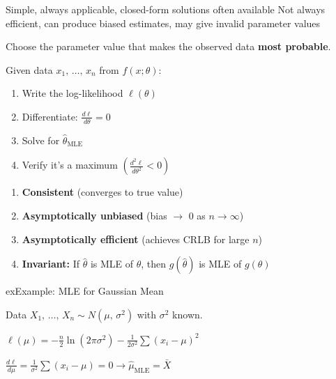 
\PSyes{} Simple, always applicable, closed-form solutions often available\PSbr{}\PSno{} Not always efficient, can produce biased estimates, may give invalid parameter values



Choose the parameter value that makes the observed data \textbf{most probable}.


Given data $x_{1},\, \ldots,\, x_{n}$ from $f(x; \theta)$:





\begin{enumerate}
\def\labelenumi{\arabic{enumi}.}
\tightlist
\item
  Write the log-likelihood $\ell (\theta)$
\item
  Differentiate: $\frac{d\ell}{d\theta} = 0$
\item
  Solve for $\hat{\theta}_{\mathrm{MLE}}$
\item
  Verify it’s a maximum $\left(\frac{d^{2}\ell}{d\theta^{2}} < 0\right)$
\end{enumerate}


\begin{enumerate}
\def\labelenumi{\arabic{enumi}.}
\tightlist
\item
  \textbf{Consistent} (converges to true value)
\item
  \textbf{Asymptotically unbiased} (bias \ensuremath{\to} 0 as $n \to \infty$)
\item
  \textbf{Asymptotically efficient} (achieves CRLB for large $n$)
\item
  \textbf{Invariant:} If $\hat{\theta}$ is MLE of $\theta$, then $g(\hat{\theta})$ is MLE of $g(\theta)$
\end{enumerate}

\begin{PSbox}[unbreakable]{ex}{Example: MLE for Gaussian Mean}

Data $X_{1},\, \ldots,\, X_{n} \sim N(\mu,\, \sigma^{2})$ with $\sigma^{2}$ known.

$\displaystyle \ell (\mu) = -\frac{n}{2}\ln (2\pi \sigma^{2}) - \frac{1}{2\sigma^{2}}\sum (x_{i} - \mu)^{2}$

$\displaystyle \frac{d\ell}{d\mu} = \frac{1}{\sigma^{2}}\sum (x_{i} - \mu) = 0 \to \hat{\mu}_{\mathrm{MLE}} = \bar{X}$

\end{PSbox}

